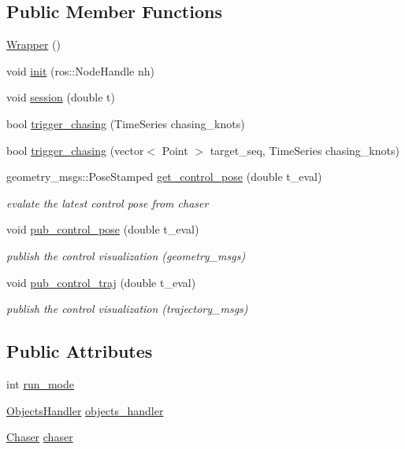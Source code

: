 \subsection*{Public Member Functions}
\begin{DoxyCompactItemize}
\item 
\hyperlink{class_wrapper_aa40ce9fcba8ab60bf01bcb0913144b4a}{Wrapper} ()
\item 
void \hyperlink{class_wrapper_af336781e7d75d525e7b152366a0e0d93}{init} (ros\+::\+Node\+Handle nh)
\item 
void \hyperlink{class_wrapper_a009ee5c325926f92df42319d5469a376}{session} (double t)
\item 
bool \hyperlink{class_wrapper_a21a0e115ea80e053e4f2defd1362b92f}{trigger\+\_\+chasing} (Time\+Series chasing\+\_\+knots)
\item 
bool \hyperlink{class_wrapper_a2da6448c77dd4edb054de4130b1fc883}{trigger\+\_\+chasing} (vector$<$ Point $>$ target\+\_\+seq, Time\+Series chasing\+\_\+knots)
\item 
geometry\+\_\+msgs\+::\+Pose\+Stamped \hyperlink{class_wrapper_ac2338df9e7b31f3291ed1cbd137a6f14}{get\+\_\+control\+\_\+pose} (double t\+\_\+eval)
\begin{DoxyCompactList}\small\item\em evalate the latest control pose from chaser \end{DoxyCompactList}\item 
void \hyperlink{class_wrapper_a94a786272ea8120469cb476d021c5b76}{pub\+\_\+control\+\_\+pose} (double t\+\_\+eval)
\begin{DoxyCompactList}\small\item\em publish the control visualization (geometry\+\_\+msgs) \end{DoxyCompactList}\item 
void \hyperlink{class_wrapper_a7f0e09c8a675991a3c987e41c6b9ff9d}{pub\+\_\+control\+\_\+traj} (double t\+\_\+eval)
\begin{DoxyCompactList}\small\item\em publish the control visualization (trajectory\+\_\+msgs) \end{DoxyCompactList}\end{DoxyCompactItemize}
\subsection*{Public Attributes}
\begin{DoxyCompactItemize}
\item 
int \hyperlink{class_wrapper_a4b4e8407edf38f99eb9d5a0cd4a0116b}{run\+\_\+mode}
\item 
\hyperlink{class_objects_handler}{Objects\+Handler} \hyperlink{class_wrapper_a8cddd5ffbaeb5ab0b5d8d8d0c74f810f}{objects\+\_\+handler}
\item 
\hyperlink{class_chaser}{Chaser} \hyperlink{class_wrapper_a750309ad3470e20a80e9d72b0d7e34cb}{chaser}
\end{DoxyCompactItemize}
